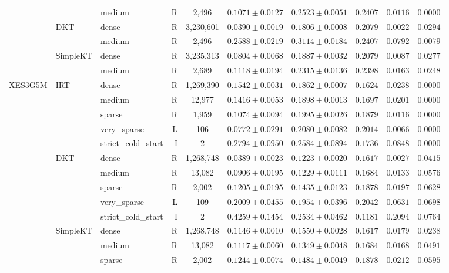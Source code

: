 \begin{table}[H]
{\begin{tabular}{lllrcccccc}
 &  & medium & R & 2,496 & $0.1071 \pm 0.0127$ & $0.2523 \pm 0.0051$ & $0.2407$ & $0.0116$ & $0.0000$ \\
 & DKT & dense & R & 3,230,601 & $0.0390 \pm 0.0019$ & $0.1806 \pm 0.0008$ & $0.2079$ & $0.0022$ & $0.0294$ \\
 &  & medium & R & 2,496 & $0.2588 \pm 0.0219$ & $0.3114 \pm 0.0184$ & $0.2407$ & $0.0792$ & $0.0079$ \\
 & SimpleKT & dense & R & 3,235,313 & $0.0804 \pm 0.0068$ & $0.1887 \pm 0.0032$ & $0.2079$ & $0.0087$ & $0.0277$ \\
 &  & medium & R & 2,689 & $0.1118 \pm 0.0194$ & $0.2315 \pm 0.0136$ & $0.2398$ & $0.0163$ & $0.0248$ \\
\midrule
XES3G5M & IRT & dense & R & 1,269,390 & $0.1542 \pm 0.0031$ & $0.1862 \pm 0.0007$ & $0.1624$ & $0.0238$ & $0.0000$ \\
 &  & medium & R & 12,977 & $0.1416 \pm 0.0053$ & $0.1898 \pm 0.0013$ & $0.1697$ & $0.0201$ & $0.0000$ \\
 &  & sparse & R & 1,959 & $0.1074 \pm 0.0094$ & $0.1995 \pm 0.0026$ & $0.1879$ & $0.0116$ & $0.0000$ \\
 &  & very\_sparse & L & 106 & $0.0772 \pm 0.0291$ & $0.2080 \pm 0.0082$ & $0.2014$ & $0.0066$ & $0.0000$ \\
 &  & strict\_cold\_start & I & 2 & $0.2794 \pm 0.0950$ & $0.2584 \pm 0.0894$ & $0.1736$ & $0.0848$ & $0.0000$ \\
 & DKT & dense & R & 1,268,748 & $0.0389 \pm 0.0023$ & $0.1223 \pm 0.0020$ & $0.1617$ & $0.0027$ & $0.0415$ \\
 &  & medium & R & 13,082 & $0.0906 \pm 0.0195$ & $0.1229 \pm 0.0111$ & $0.1684$ & $0.0133$ & $0.0576$ \\
 &  & sparse & R & 2,002 & $0.1205 \pm 0.0195$ & $0.1435 \pm 0.0123$ & $0.1878$ & $0.0197$ & $0.0628$ \\
 &  & very\_sparse & L & 109 & $0.2009 \pm 0.0455$ & $0.1954 \pm 0.0396$ & $0.2042$ & $0.0631$ & $0.0698$ \\
 &  & strict\_cold\_start & I & 2 & $0.4259 \pm 0.1454$ & $0.2534 \pm 0.0462$ & $0.1181$ & $0.2094$ & $0.0764$ \\
 & SimpleKT & dense & R & 1,268,748 & $0.1146 \pm 0.0010$ & $0.1550 \pm 0.0028$ & $0.1617$ & $0.0179$ & $0.0238$ \\
 &  & medium & R & 13,082 & $0.1117 \pm 0.0060$ & $0.1349 \pm 0.0048$ & $0.1684$ & $0.0168$ & $0.0491$ \\
 &  & sparse & R & 2,002 & $0.1244 \pm 0.0074$ & $0.1484 \pm 0.0049$ & $0.1878$ & $0.0212$ & $0.0595$ \\

\end{tabular}}
\end{table}
